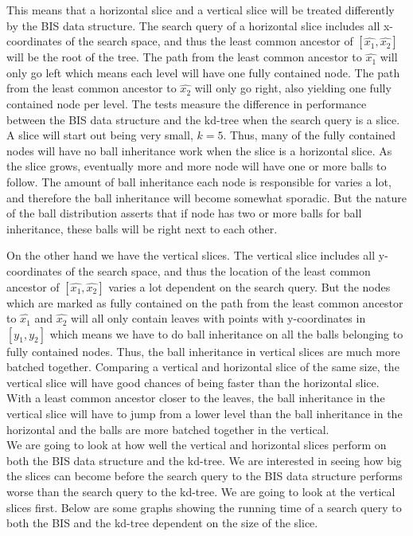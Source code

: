 This means that a horizontal slice and a vertical slice will be treated differently by the BIS data structure. The search query of a horizontal slice includes all x-coordinates of the search space, and thus the least common ancestor of $[\hat{x_1}, \hat{x_2}]$ will be the root of the tree. The path from the least common ancestor to $\hat{x_1}$ will only go left which means each level will have one fully contained node. The path from the least common ancestor to $\hat{x_2}$ will only go right, also yielding one fully contained node per level. The tests measure the difference in performance between the BIS data structure and the kd-tree when the search query is a slice. A slice will start out being very small, $k=5$. Thus, many of the fully contained nodes will have no ball inheritance work when the slice is a horizontal slice. As the slice grows, eventually more and more node will have one or more balls to follow. The amount of ball inheritance each node is responsible for varies a lot, and therefore the ball inheritance will become somewhat sporadic. But the nature of the ball distribution asserts that if node has two or more balls for ball inheritance, these balls will be right next to each other.

On the other hand we have the vertical slices. The vertical slice includes all y-coordinates of the search space, and thus the location of the least common ancestor of $[\hat{x_1}, \hat{x_2}]$ varies a lot dependent on the search query. But the nodes which are marked as fully contained on the path from the least common ancestor to $\hat{x_1}$ and $\hat{x_2}$ will all only contain leaves with points with y-coordinates in $[y_1, y_2]$ which means we have to do ball inheritance on all the balls belonging to fully contained nodes. Thus, the ball inheritance in vertical slices are much more batched together. Comparing a vertical and horizontal slice of the same size, the vertical slice will have good chances of being faster than the horizontal slice. With a least common ancestor closer to the leaves, the ball inheritance in the vertical slice will have to jump from a lower level than the ball inheritance in the horizontal and the balls are more batched together in the vertical. \\

We are going to look at how well the vertical and horizontal slices perform on both the BIS data structure and the kd-tree. We are interested in seeing how big the slices can become before the search query to the BIS data structure performs worse than the search query to the kd-tree. We are going to look at the vertical slices first. Below are some graphs showing the running time of a search query to both the BIS and the kd-tree dependent on the size of the slice. 

